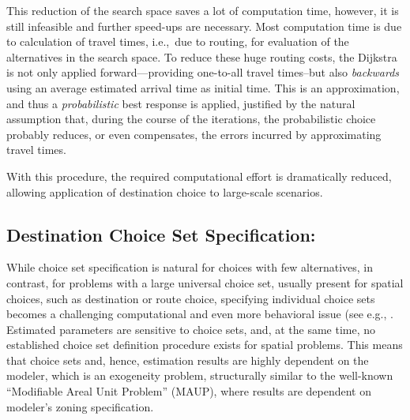 This reduction of the search space saves a lot of computation time, however, it is still infeasible and further speed-ups are necessary. Most computation time is due to calculation of travel times, i.e.,\ due to routing, for evaluation of the alternatives in the search space. To reduce these huge routing costs, the Dijkstra is not only applied forward---providing one-to-all travel times--but also \emph{backwards} using an average estimated arrival time as initial time. This is an approximation, and thus a \emph{probabilistic} best response is applied, justified by the natural assumption that, during the course of the iterations, the probabilistic choice probably reduces, or even compensates, the errors incurred by approximating travel times. 

With this procedure, the required computational effort is dramatically reduced, allowing application of destination choice to large-scale scenarios.

\subsection{Destination Choice Set Specification:}
While choice set specification is natural for choices with few alternatives, in contrast, for problems with a large universal choice set, usually present for spatial choices, such as destination or route choice, specifying individual choice sets becomes a challenging computational and even more behavioral issue (see e.g., \citet[][]{PagliaraTimmermans_TransLett_2009, Thill_PHG_1992, Schuessler_PhDThesis_2010, FrejingerEtAl_TransResB_2009}. Estimated parameters are sensitive to choice sets, and, at the same time, no established choice set definition procedure exists for spatial problems. This means that choice sets and, hence, estimation results are highly dependent on the modeler, which is an exogeneity problem, structurally similar to the well-known ``Modifiable Areal Unit Problem'' (MAUP), where results are dependent on modeler's zoning specification.

